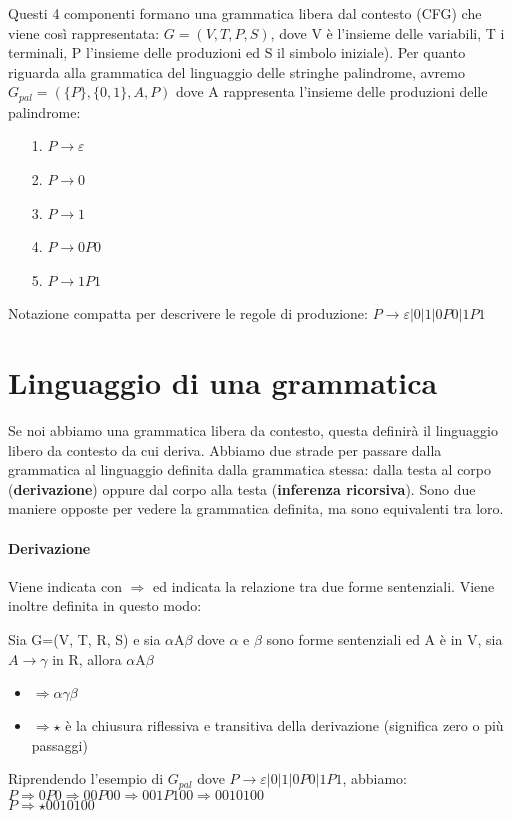 Questi 4 componenti formano una grammatica libera dal contesto (CFG) che viene così
rappresentata: $G=(V,T,P,S)$, dove V è l'insieme delle variabili, T i terminali, 
P l'insieme delle produzioni ed S il simbolo iniziale).
Per quanto riguarda alla grammatica del linguaggio delle stringhe palindrome, avremo
$G_{pal}=(\{P\}, \{0,1\}, A, P)$ dove A rappresenta l'insieme delle produzioni delle
palindrome:
\begin{itemize}
\item[1.] $P \rightarrow \varepsilon$
\item[2.] $P \rightarrow 0$
\item[3.] $P \rightarrow 1$
\item[4.] $P \rightarrow 0P0$
\item[5.] $P \rightarrow 1P1$
\end{itemize}
Notazione compatta per descrivere le regole di produzione: $P \rightarrow \varepsilon
 | 0 | 1 | 0P0 | 1P1$

\section{Linguaggio di una grammatica}
Se noi abbiamo una grammatica libera da contesto, questa definirà il linguaggio 
libero da contesto da cui deriva. Abbiamo due strade per passare dalla grammatica al 
linguaggio definita dalla grammatica stessa: dalla testa al corpo 
(\textbf{derivazione}) oppure dal corpo alla testa (\textbf{inferenza ricorsiva}). 
Sono due maniere opposte per vedere la grammatica definita, ma sono equivalenti tra 
loro.

\paragraph{Derivazione}
Viene indicata con $\Rightarrow$ ed indicata la relazione tra due forme sentenziali.
Viene inoltre definita in questo modo:
\begin{defn}[Derivazione]
Sia G=(V, T, R, S) e sia $\alpha$A$\beta$ dove $\alpha$ e $\beta$ sono forme
sentenziali ed A è in V, sia $A\rightarrow\gamma$ in R, allora $\alpha$A$\beta$
\begin{itemize}
\item $\Rightarrow \alpha\gamma\beta$
\item $\Rightarrow\star$ è la chiusura riflessiva e transitiva della derivazione 
(significa zero o più passaggi)
\end{itemize}
\end{defn}

Riprendendo l'esempio di $G_{pal}$ dove $P\rightarrow\varepsilon|0|1|0P0|1P1$, 
abbiamo:
\\[0.3cm]
$P\Rightarrow 0P0\Rightarrow 00P00 \Rightarrow 001P100 \Rightarrow 0010100$
\\[0.3cm]
$P\Rightarrow \star 0010100$


















